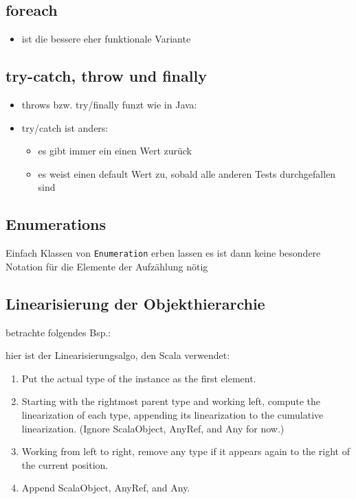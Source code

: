 \subsection{foreach}
\begin{itemize}
  \item ist die bessere \und eher funktionale Variante 
  
  
\end{itemize}


\subsection{try-catch, throw und finally}
\begin{itemize}
  \item throws bzw. try/finally funzt wie in Java:
  
  
  
  \item try/catch ist anders:
  \begin{itemize}
    \item es gibt immer ein einen Wert zurück
    \item es weist einen default Wert zu, sobald alle anderen Tests
    durchgefallen sind
    
        
  \end{itemize}
\end{itemize}


\subsection{Enumerations}
Einfach Klassen von \texttt{Enumeration} erben lassen \und es ist dann
keine besondere Notation für die Elemente der Aufzählung nötig




\subsection{Linearisierung der Objekthierarchie}
betrachte folgendes Bsp.:




hier ist der Linearisierungsalgo, den Scala verwendet:

\begin{enumerate}
  \item Put the actual type of the instance as the first element.
  \item Starting with the rightmost parent type and working left, compute the linearization
of each type, appending its linearization to the cumulative linearization. (Ignore
ScalaObject, AnyRef, and Any for now.)
  \item Working from left to right, remove any type if it appears again to the right of the
current position.
  \item Append ScalaObject, AnyRef, and Any.
\end{enumerate}
\pagebreak


